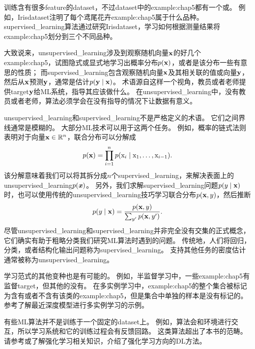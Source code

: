 训练含有很多\gls{feature}的\gls{dataset}，不过\gls{dataset}中的\gls{example:chap5}都有一个或。
例如，Iris\gls{dataset}注明了每个鸢尾花卉\gls{example:chap5}属于什么品种。
\gls{supervised_learning}算法通过研究Iris\gls{dataset}，学习如何根据测量结果将\gls{example:chap5}划分到三个不同品种。

大致说来，\gls{unsupervised_learning}涉及到观察随机向量$\mathbf{x}$的好几个\gls{example:chap5}，试图隐式或显式地学习出概率分布$p(\mathbf{x})$，或者是该分布一些有意思的性质；
而\gls{supervised_learning}包含观察随机向量$\mathbf{x}$及其相关联的值或向量$\mathbf{y}$，然后从$\mathbf{x}$预测$\mathbf{y}$，通常是估计$p(\mathbf{y}\mid\mathbf{x})$。
术语源自这样一个视角，教员或者老师提供\gls{target}$\mathbf{y}$给\gls{ML}系统，指导其应该做什么。
在\gls{unsupervised_learning}中，没有教员或者老师，算法必须学会在没有指导的情况下让数据有意义。

\gls{unsupervised_learning}和\gls{supervised_learning}不是严格定义的术语。
它们之间界线通常是模糊的。
大部分\gls{ML}技术可以用于这两个任务。
例如，概率的链式法则表明对于向量$\mathbf{x}\in\mathbb{R}^n$，联合分布可以分解成
\begin{equation}
    p(\mathbf{x}) = \prod_{i=1}^n p(\mathrm{x}_i \mid \mathrm{x}_1,\dots,\mathrm{x}_{i-1}) .
\end{equation}
该分解意味着我们可以将其拆分成$n$个\gls{supervised_learning}，来解决表面上的\gls{unsupervised_learning}$p(\boldsymbol{\mathit{x}})$。
另外，我们求解\gls{supervised_learning}问题$p(y\mid\mathbf{x})$时，也可以使用传统的\gls{unsupervised_learning}技巧学习联合分布$p(\mathbf{x},y)$，然后推断
\begin{equation}
    p(y\mid\mathbf{x}) = \frac{p(\mathbf{x},y)}{\sum_{y'}p(\mathbf{x},y')}.
\end{equation}
尽管\gls{unsupervised_learning}和\gls{supervised_learning}并非完全没有交集的正式概念，它们确实有助于粗略分类我们研究\gls{ML}算法时遇到的问题。
传统地，人们将回归，分类，或者结构化输出问题称为\gls{supervised_learning}。
支持其他任务的密度估计通常被称为\gls{unsupervised_learning}。


学习范式的其他变种也是有可能的。
例如，半监督学习中，一些\gls{example:chap5}有监督\gls{target}，但其他的没有。
在多实例学习中，\gls{example:chap5}的整个集合被标记为含有或者不含有该类的\gls{example:chap5}，但是集合中单独的样本是没有标记的。
参考\cite{Kotzias2015}了解最近深度模型进行多实例学习的示例。

有些\gls{ML}算法并不是训练于一个固定的\gls{dataset}上。
例如，算法会和环境进行交互，所以学习系统和它的训练过程会有反馈回路。
这类算法超出了本书的范畴。
请参考\cite{Sutton+Barto-98}或\cite{Bertsekas+Tsitsiklis-book1996}了解强化学习相关知识，\cite{Mnih2013}介绍了强化学习方向的\gls{DL}方法。


